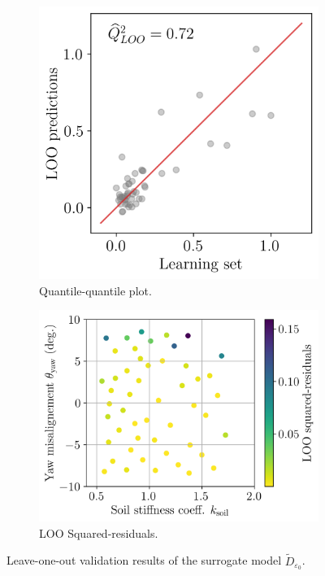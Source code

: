 \begin{figure}[h!]
    \centering
    \begin{subfigure}[t]{0.36\linewidth}
        \includegraphics[width=\linewidth]{./part3/figures/OWT/loo_qqplot.png}
        \caption{Quantile-quantile plot.}
    \end{subfigure}
    \begin{subfigure}[t]{0.48\linewidth}
        \includegraphics[width=\linewidth]{./part3/figures/OWT/loo_squared_res.png}
        \caption{LOO Squared-residuals.}
    \end{subfigure}
    \caption{Leave-one-out validation results of the surrogate model $\widetilde{D}_{\varepsilon_0}$.}
    \label{fig:loo_validation}
\end{figure}

